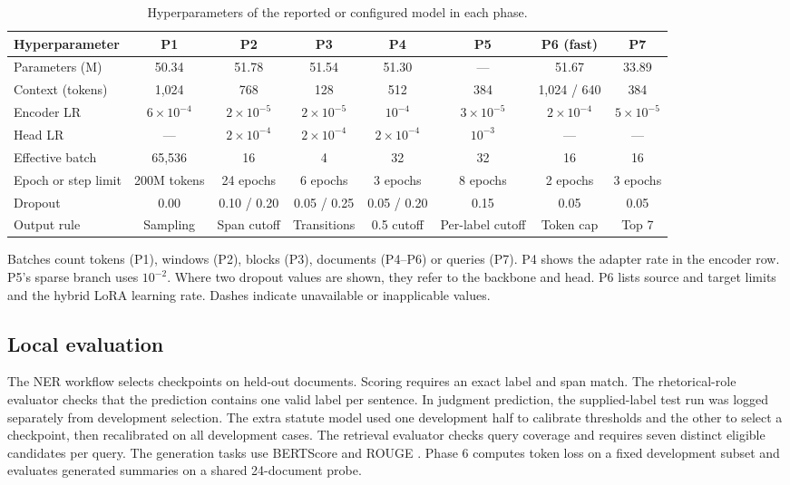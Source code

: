 \documentclass[11pt, oneside]{article}
\begin{document}
\begin{table}[H]
\centering\scriptsize
\setlength{\tabcolsep}{4pt}
\caption{Hyperparameters of the reported or configured model in each phase.}
\label{tab:hparams}
\begin{tabular}{@{}lccccccc@{}}
\toprule
Hyperparameter & P1 & P2 & P3 & P4 & P5 & P6 (fast) & P7 \\
\midrule
Parameters (M) & 50.34 & 51.78 & 51.54 & 51.30 & --- & 51.67 & 33.89 \\
Context (tokens) & 1,024 & 768 & 128 & 512 & 384 & 1,024 / 640 & 384 \\
Encoder LR & $6\!\times\!10^{-4}$ & $2\!\times\!10^{-5}$ & $2\!\times\!10^{-5}$ & $10^{-4}$ & $3\!\times\!10^{-5}$ & $2\!\times\!10^{-4}$ & $5\!\times\!10^{-5}$ \\
Head LR & --- & $2\!\times\!10^{-4}$ & $2\!\times\!10^{-4}$ & $2\!\times\!10^{-4}$ & $10^{-3}$ & --- & --- \\
Effective batch & 65,536 & 16 & 4 & 32 & 32 & 16 & 16 \\
Epoch or step limit & 200M tokens & 24 epochs & 6 epochs & 3 epochs & 8 epochs & 2 epochs & 3 epochs \\
Dropout & 0.00 & 0.10 / 0.20 & 0.05 / 0.25 & 0.05 / 0.20 & 0.15 & 0.05 & 0.05 \\
Output rule & Sampling & Span cutoff & Transitions & 0.5 cutoff & Per-label cutoff & Token cap & Top 7 \\
\bottomrule
\end{tabular}

\smallskip
\parbox{\linewidth}{\footnotesize Batches count tokens (P1), windows (P2), blocks (P3), documents (P4--P6) or queries (P7). P4 shows the adapter rate in the encoder row. P5's sparse branch uses $10^{-2}$. Where two dropout values are shown, they refer to the backbone and head. P6 lists source and target limits and the hybrid LoRA learning rate. Dashes indicate unavailable or inapplicable values.}
\end{table}

\subsection{Local evaluation}

The NER workflow selects checkpoints on held-out documents. Scoring requires an exact label and span match. The rhetorical-role evaluator checks that the prediction contains one valid label per sentence. In judgment prediction, the supplied-label test run was logged separately from development selection. The extra statute model used one development half to calibrate thresholds and the other to select a checkpoint, then recalibrated on all development cases. The retrieval evaluator checks query coverage and requires seven distinct eligible candidates per query. The generation tasks use BERTScore and ROUGE \citep{bertscore,rouge}. Phase 6 computes token loss on a fixed development subset and evaluates generated summaries on a shared 24-document probe.
\end{document}
